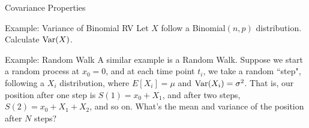 \begin{frame}[allowframebreaks]{Covariance Properties}
  \framebreak
  
  \begin{exampleblock}{Example: Variance of Binomial RV}
    Let $X$ follow a Binomial$(n, p)$ distribution. Calculate $\mathrm{Var}(X)$.
    
    
  \end{exampleblock}
  
  
  \framebreak
  
  \begin{exampleblock}{Example: Random Walk}
    A similar example is a \alert{Random Walk}. Suppose we start a random process at $x_0 = 0$, and at each time point $t_i$, we take a random ``step", following a $X_i$ distribution, where $E[X_i] = \mu$ and $\mathrm{Var}(X_i) = \sigma^2$.
    That is, our position after one step is $S(1) = x_0 + X_1$, and after two steps, $S(2) = x_0 + X_1 + X_2$, and so on. What's the mean and variance of the position after $N$ steps? 
    

\end{exampleblock}
\end{frame}
